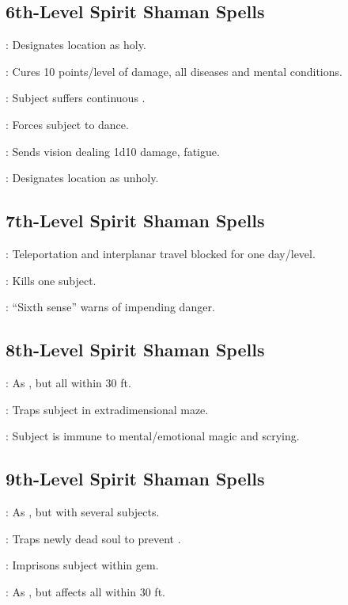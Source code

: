 \begin{multicols}{2}
\subsection{6th-Level Spirit Shaman Spells}
\begin{description*}
\item[\linkspell{Hallow}:] Designates location as holy.
\item[\linkspell{Heal}:] Cures 10 points/level of damage, all diseases and mental conditions.
\item[\linkspell{Insanity}:] Subject suffers continuous .
\item[\linkspell{Otto’s Irresistible Dance}:] Forces subject to dance.
\item[\linkspell{Nightmare}:] Sends vision dealing 1d10 damage, fatigue. 
\item[\linkspell{Unhallow}:] Designates location as unholy.
\end{description*}

\subsection{7th-Level Spirit Shaman Spells}
\begin{description*}
\item[\linkspell{Dimensional Lock}:] Teleportation and interplanar travel blocked for one day/level.
\item[\linkspell{Finger of Death}:] Kills one subject.
\item[\linkspell{Foresight}:] “Sixth sense” warns of impending danger.
\end{description*}

\subsection{8th-Level Spirit Shaman Spells}
\begin{description*}
\item[\linkspell{Charm Monster, Mass}:] As , but all within 30 ft.
\item[\linkspell{Maze}:] Traps subject in extradimensional maze.
\item[\linkspell{Mind Blank}:] Subject is immune to mental/emotional magic and scrying.
\end{description*}

\subsection{9th-Level Spirit Shaman Spells}
\begin{description*}
\item[\linkspell{Heal, Mass}:] As , but with several subjects.
\item[\linkspell{Soul Bind}:] Traps newly dead soul to prevent .
\item[\linkspell{Trap the Soul}:] Imprisons subject within gem.
\item[\linkspell{Weird}:] As , but affects all within 30 ft.
\end{description*}

\end{multicols}